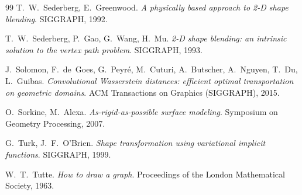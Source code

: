 \documentclass[11pt,a4paper]{article}
\begin{document}
\begin{thebibliography}{99}
 T.~W.~Sederberg, E.~Greenwood.
  \emph{A physically based approach to 2-D shape blending}. SIGGRAPH, 1992.

 T.~W.~Sederberg, P.~Gao, G.~Wang, H.~Mu.
  \emph{2-D shape blending: an intrinsic solution to the vertex path
  problem}. SIGGRAPH, 1993.

 J.~Solomon, F.~de~Goes, G.~Peyr\'e, M.~Cuturi,
  A.~Butscher, A.~Nguyen, T.~Du, L.~Guibas.
  \emph{Convolutional Wasserstein distances: efficient optimal
  transportation on geometric domains}. ACM Transactions on Graphics
  (SIGGRAPH), 2015.

 O.~Sorkine, M.~Alexa.
  \emph{As-rigid-as-possible surface modeling}. Symposium on Geometry
  Processing, 2007.

 G.~Turk, J.~F.~O'Brien.
  \emph{Shape transformation using variational implicit functions}.
  SIGGRAPH, 1999.

 W.~T.~Tutte.
  \emph{How to draw a graph}. Proceedings of the London Mathematical
  Society, 1963.

\end{thebibliography}
\end{document}
